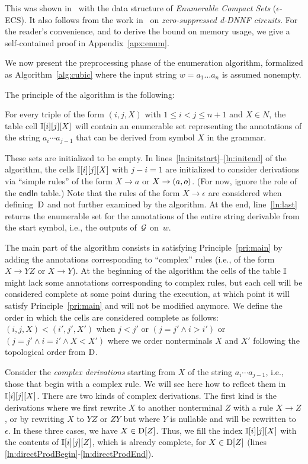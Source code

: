This was shown in~\cite[Theorem 9]{icdt2020nested} with the data structure of
\emph{Enumerable Compact Sets} ($\epsilon$-ECS). It also follows from the work
in~\cite{amarilli2017circuit} on \emph{zero-suppressed d-DNNF circuits}. For the
reader's convenience, and to derive the bound on memory usage, we give a
self-contained proof in Appendix~\ref{apx:enum}.

We now present the preprocessing phase of the enumeration algorithm, formalized as
Algorithm~\ref{alg:cubic} where the  input string $w=a_1\ldots a_n$ is
assumed nonempty. 

The principle of the algorithm is the following:
\begin{principle}
  \label{pri:main}
    For every triple
of the form $(i,j,X)$ with $1\leq i < j \leq n+1$ and $X\in N$, the
table cell $\mathbb{I}[i][j][X]$ will contain an enumerable set
representing the annotations of the string $a_i \cdots a_{j-1}$ that
can be derived from symbol $X$ in the grammar.
\end{principle}
%
These sets are initialized to be empty.
In lines~\ref{ln:initstart}--\ref{ln:initend} of the algorithm, the cells $\mathbb{I}[i][j][X]$ with
$j-i=1$ are initialized
to consider derivations via ``simple rules'' of the form $X \rightarrow a$ or
$X \rightarrow (a, \oout)$.
(For now, ignore the role of the
$\mathsf{endIn}$ table.) Note that the rules of the form $X \rightarrow
\epsilon$ are considered when defining~$\mathrm{D}$ and not further examined by the algorithm. At the end, line~\ref{ln:last} returns the
enumerable set for the annotations of the entire string derivable from
the start symbol, i.e., the outputs of~$\mathcal{G}$ on~$w$.

%
%
%
%

The main part of the algorithm consists in satisfying Principle~\ref{pri:main} by adding
the annotations corresponding to ``complex'' rules (i.e., of the form
$X\rightarrow YZ$ or $X\rightarrow Y$). At the beginning of the
algorithm the cells of the table $\mathbb{I}$ might lack some annotations
corresponding to complex rules, but each cell will be considered
complete at some point during the execution, at which point it will
satisfy Principle~\ref{pri:main} and will not be modified anymore.
%
We define the order in which the cells are considered complete as follows:
$(i,j,X)<(i',j',X')$ when $j<j'$ or
$(j=j' \land i>i')$ or $(j=j' \land i=i' \land X < X')$ where we order
nonterminals $X$ and $X'$ following the topological order from $\mathrm{D}$.

Consider the \emph{complex derivations} starting from $X$ of the string $a_i \cdots
a_{j-1}$, i.e., those that begin with a complex rule. We will see here how to
reflect them in $\mathbb{I}[i][j][X]$. There are two kinds of complex
derivations. The first kind is the derivations where we first rewrite $X$
to another nonterminal $Z$ with a rule $X \rightarrow Z$, or by
rewriting $X$ to $YZ$ or $ZY$ but where $Y$ is nullable and will be
rewritten to~$\epsilon$. In these three cases, we have
$X \in \mathrm{D}[Z]$. Thus, we fill the index $\mathbb{I}[i][j][X]$ with the
contents of $\mathbb{I}[i][j][Z]$, which is already complete, for
$X\in \mathrm{D}[Z]$ (lines \ref{ln:directProdBegin}-\ref{ln:directProdEnd}).
%
%

